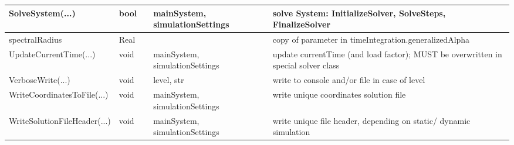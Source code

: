 \begin{center}
\begin{longtable}{| p{4.2cm} | p{2.5cm} | p{0.3cm} | p{3.0cm} | p{6cm} |}
    SolveSystem(...) &     bool &      &     mainSystem, simulationSettings &     solve System: InitializeSolver, SolveSteps, FinalizeSolver\\ \hline
    spectralRadius &     Real &      &      &     copy of parameter in timeIntegration.generalizedAlpha\\ \hline
    UpdateCurrentTime(...) &     void &      &     mainSystem, simulationSettings &     update currentTime (and load factor); MUST be overwritten in special solver class\\ \hline
    VerboseWrite(...) &     void &      &     level, str &     write to console and/or file in case of level\\ \hline
    WriteCoordinatesToFile(...) &     void &      &     mainSystem, simulationSettings &     write unique coordinates solution file\\ \hline
    WriteSolutionFileHeader(...) &     void &      &     mainSystem, simulationSettings &     write unique file header, depending on static/ dynamic simulation\\ \hline
	  \end{longtable}
	\end{center}


